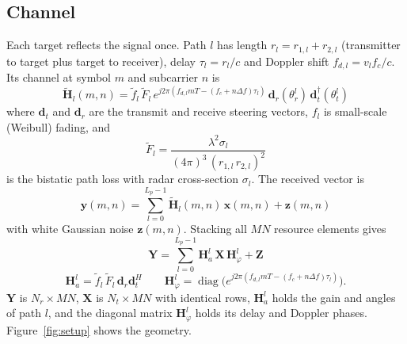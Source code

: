 \documentclass[11pt,a4paper]{article}
\newcommand{\BH}{\mathbf{H}}
\newcommand{\BX}{\mathbf{X}}
\newcommand{\BY}{\mathbf{Y}}
\newcommand{\BZ}{\mathbf{Z}}
\begin{document}
\subsection{Channel}
Each target reflects the signal once. Path $l$ has length $r_l=r_{1,l}+r_{2,l}$ (transmitter to target plus target to receiver), delay $\tau_l=r_l/c$ and Doppler shift $f_{d,l}=v_l f_c/c$. Its channel at symbol $m$ and subcarrier $n$ is
\begin{equation}
    \tilde{\mathbf{H}}_l(m,n)=\tilde{f}_l\,\tilde{F}_l\,e^{j2\pi(f_{d,l}mT-(f_c+n\Delta f)\tau_l)}\,\mathbf{d}_r(\theta_r^l)\,\mathbf{d}_t^\dagger(\theta_t^l)
\end{equation}
where $\mathbf{d}_t$ and $\mathbf{d}_r$ are the transmit and receive steering vectors, $f_l$ is small-scale (Weibull) fading, and
\begin{equation}
  \tilde{F}_l=\frac{\lambda^2\sigma_l}{(4\pi)^3\,(r_{1,l}\,r_{2,l})^2}
\end{equation}
is the bistatic path loss with radar cross-section $\sigma_l$. The received vector is
\begin{equation}
  \mathbf{y}(m,n)=\sum_{l=0}^{L_p-1}\tilde{\BH}_l(m,n)\,\mathbf{x}(m,n)+\mathbf{z}(m,n)
\end{equation}
with white Gaussian noise $\mathbf{z}(m,n)$. Stacking all $MN$ resource elements gives~\cite[eq.~(9)]{isacnet}
\begin{equation}
    \BY=\sum_{l=0}^{L_p-1}\BH_a^l\,\BX\,\BH_\varphi^l+\BZ
\end{equation}
\begin{equation}
    \BH_a^l=\tilde{f}_l\,\tilde{F}_l\,\mathbf{d}_r\mathbf{d}_t^H\qquad
  \BH_\varphi^l=\operatorname{diag}\!\big(e^{j2\pi(f_{d,l}mT-(f_c+n\Delta f)\tau_l)}\big).
\end{equation}
$\BY$ is $N_r\times MN$, $\BX$ is $N_t\times MN$ with identical rows, $\BH_a^l$ holds the gain and angles of path $l$, and the diagonal matrix $\BH_\varphi^l$ holds its delay and Doppler phases.
Figure~\ref{fig:setup} shows the geometry.
\end{document}
